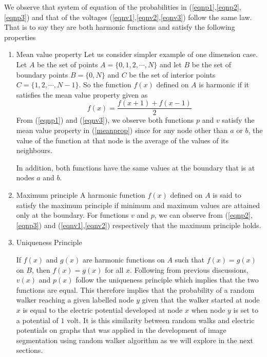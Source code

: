 \documentclass[10pt,a4paper]{article}
\begin{document}
We observe that system of equation of the probabilities in (\ref{eqnp1},\ref{eqnp2},\ref{eqnp3}) and that of the voltages (\ref{eqnv1},\ref{eqnv2},\ref{eqnv3}) follow the same law. That is to say they are both harmonic functions and satisfy the following properties
\begin{enumerate}
	\item Mean value property
	Let us consider simpler example of one dimension case. Let $A$ be the set of points $A=\{0,1,2,\cdots,N\}$ and let $B$ be the set of  boundary points $B=\{ 0,N\}$ and $C$ be the set of interior points $C = \{ 1,2,\cdots, N-1\}$. So the function $f(x)$ defined on $A$ is harmonic if it satisfies the mean value property given as
	\begin{equation}
	f(x) = \frac{f(x+1) + f(x-1)}{2}
	\label{meanprop}
	\end{equation}
From (\ref{eqnp1}) and (\ref{eqnv3}), we observe both functions $p$ and $v$ satisfy the mean value property in (\ref{meanprop}) since for any node other than $a$ or $b$, the value of the function at that node is the average of the values of its neighbours. 

In addition, both functions have the same values at the boundary that is at nodes $a$ and $b$.
  \item Maximum principle
  A harmonic function $f(x)$ defined on $A$ is said to satisfy the maximum principle if minimum and maximum values are attained only at the boundary. For functions $v$ and $p$, we can observe from (\ref{eqnp2},\ref{eqnp3}) and (\ref{eqnv1},\ref{eqnv2}) respectively that the maximum principle holds.
  
  \item Uniqueness Principle
  
  If $f(x)$ and $g(x)$ are harmonic functions on $A$ such that $f(x)=g(x)$ on $B$, then $f(x)=g(x)$ for all $x$. Following from previous discussions, $v(x)$ and $p(x)$ follow the uniqueness principle which implies that the two functions are equal. This therefore implies that the probability of a random walker reaching a given labelled node $y$ given that the walker started at node $x$ is equal to the electric potential developed at node $x$ when node $y$ is set to a potential of $1$ volt. It is this similarity between random walks and electric potentials on graphs that was applied in the development of  image segmentation using random walker algorithm as we will explore in the next sections.
\end{enumerate}
	
\end{document}
